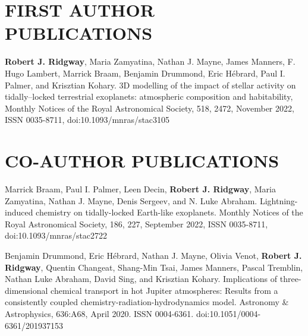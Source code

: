 \documentclass[letter, margin, 10pt]{res} %
\newcommand{\mycomment}[1]{}
\begin{document}
\begin{resume}
\mycomment{
\section{VOLUNTEER EXPERIENCE}

{\sl Scout Leader}, 2011-2018
\begin{itemize}[noitemsep,topsep=0pt,parsep=0pt,partopsep=0pt]
\item Scout leader with the 193rd Edgemont Scout Group
\item Worked as part of a group, planning, organising, and running group activities and weekly meetings
\end{itemize}
}

\section{FIRST AUTHOR PUBLICATIONS}

\textbf{Robert J. Ridgway}, Maria Zamyatina, Nathan J. Mayne, James Manners, F. Hugo Lambert, Marrick Braam, Benjamin Drummond, Eric H\'{e}brard, Paul I. Palmer, and Krisztian Kohary. 3D modelling of the impact of stellar activity on tidally–locked terrestrial exoplanets: atmospheric composition and
habitability, Monthly Notices of the Royal Astronomical Society, 518, 2472, November 2022, ISSN 0035-8711, doi:10.1093/mnras/stac3105

\section{CO-AUTHOR PUBLICATIONS}

Marrick Braam, Paul I. Palmer, Leen Decin, \textbf{Robert J. Ridgway}, Maria Zamyatina, Nathan J. Mayne, Denis Sergeev, and N. Luke Abraham. Lightning-induced chemistry on tidally-locked Earth-like exoplanets. Monthly Notices of the Royal Astronomical Society, 186, 227, September 2022, ISSN 0035-8711, doi:10.1093/mnras/stac2722

Benjamin Drummond, Eric H\'{e}brard, Nathan J. Mayne, Olivia Venot, \textbf{Robert J. Ridgway}, Quentin Changeat, Shang-Min Tsai, James Manners, Pascal Tremblin, Nathan Luke Abraham, David Sing, and Krisztian Kohary. Implications of three-dimensional chemical transport in hot Jupiter atmospheres: Results from a consistently coupled chemistry-radiation-hydrodynamics model. Astronomy \& Astrophysics, 636:A68, April 2020. ISSN 0004-6361. doi:10.1051/0004-6361/201937153


\end{resume}
\end{document}
